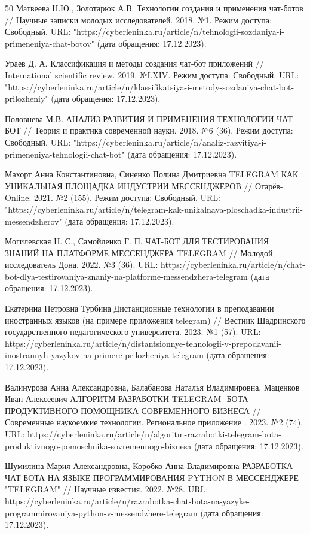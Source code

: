 \documentclass{article}
\begin{document}
\begin{thebibliography} {50}
Матвеева Н.Ю., Золотарюк А.В. Технологии создания и применения чат-ботов // Научные записки молодых исследователей. 2018. №1. Режим доступа: Свободный. URL: "https://cyberleninka.ru/article/n/tehnologii-sozdaniya-i-primeneniya-chat-botov" (дата обращения: 17.12.2023).

Ураев Д. А. Классификация и методы создания чат-бот приложений // International scientific review. 2019. №LXIV. Режим доступа: Свободный. URL: "https://cyberleninka.ru/article/n/klassifikatsiya-i-metody-sozdaniya-chat-bot-prilozheniy" (дата обращения: 17.12.2023).

Половнева М.В. АНАЛИЗ РАЗВИТИЯ И ПРИМЕНЕНИЯ ТЕХНОЛОГИИ ЧАТ-БОТ // Теория и практика современной науки. 2018. №6 (36). Режим доступа: Свободный. URL: "https://cyberleninka.ru/article/n/analiz-razvitiya-i-primeneniya-tehnologii-chat-bot" (дата обращения: 17.12.2023).

Махорт Анна Константиновна, Синенко Полина Дмитриевна TELEGRAM КАК УНИКАЛЬНАЯ ПЛОЩАДКА ИНДУСТРИИ МЕССЕНДЖЕРОВ // Огарёв-Online. 2021. №2 (155). Режим доступа: Свободный. URL: "https://cyberleninka.ru/article/n/telegram-kak-unikalnaya-ploschadka-industrii-messendzherov" (дата обращения: 17.12.2023).

Могилевская Н. С., Самойленко Г. П. ЧАТ-БОТ ДЛЯ ТЕСТИРОВАНИЯ ЗНАНИЙ НА ПЛАТФОРМЕ МЕССЕНДЖЕРА TELEGRAM // Молодой исследователь Дона. 2022. №3 (36). URL: https://cyberleninka.ru/article/n/chat-bot-dlya-testirovaniya-znaniy-na-platforme-messendzhera-telegram (дата обращения: 17.12.2023).

Екатерина Петровна Турбина Дистанционные технологии в преподавании иностранных языков (на примере приложения telegram) // Вестник Шадринского государственного педагогического университета. 2023. №1 (57). URL: https://cyberleninka.ru/article/n/distantsionnye-tehnologii-v-prepodavanii-inostrannyh-yazykov-na-primere-prilozheniya-telegram (дата обращения: 17.12.2023).

Валинурова Анна Александровна, Балабанова Наталья Владимировна, Маценков Иван Алексеевич АЛГОРИТМ РАЗРАБОТКИ TELEGRAM -БОТА - ПРОДУКТИВНОГО ПОМОЩНИКА СОВРЕМЕННОГО БИЗНЕСА // Современные наукоемкие технологии. Региональное приложение . 2023. №2 (74). URL: https://cyberleninka.ru/article/n/algoritm-razrabotki-telegram-bota-produktivnogo-pomoschnika-sovremennogo-biznesa (дата обращения: 17.12.2023).

Шумилина Мария Александровна, Коробко Анна Владимировна РАЗРАБОТКА ЧАТ-БОТА НА ЯЗЫКЕ ПРОГРАММИРОВАНИЯ PYTHON В МЕССЕНДЖЕРЕ "TELEGRAM" // Научные известия. 2022. №28. URL: https://cyberleninka.ru/article/n/razrabotka-chat-bota-na-yazyke-programmirovaniya-python-v-messendzhere-telegram (дата обращения: 17.12.2023).


\end{thebibliography}
\end{document}
